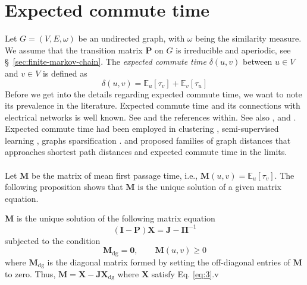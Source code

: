 \section{Expected commute time}
\label{sec:expect-comm-time}
Let $G = (V,E,\omega)$ be an undirected graph, with $\omega$ being the
similarity measure. We assume that the transition matrix
$\mathbf{P}$ on $G$ is irreducible and aperiodic, see
\S ~\ref{sec:finite-markov-chain}. The {\em expected commute time}
$\delta(u,v)$ between $u \in V$ and $v \in V$ is defined as
\begin{equation}
  \label{eq:25}
  \delta(u,v) = \mathbb{E}_{u}[\tau_v] + \mathbb{E}_{v}[\tau_u]
\end{equation}
Before we get into the details regarding expected commute time, we
want to note its prevalence in the literature. Expected commute time
and its connections with electrical networks is well known. See
\citet{doyle84:_random_walks_elect_networ,klein93:_resis_distan} and
the references within. See also \citep[\S 9 and
\S10][]{levin09:_markov}, \citep[\S 4][]{aldous99:_rever_markov} and
\citep{lyons:_probab_trees_networ}. Expected commute time
had been employed in clustering
\citep{saerens04,yen07:_graph,qui07:_clust}, semi-supervised learning
\citep{szummer01:_partial_markov,zhou04:_learn,zhou04:_learn_label_unlab,zhu03:_semi_super_learn_using_gauss},
graphs sparsification
\citep{spielmand08:_graph}. \citet{yen08:_famil_of_dissim_measur_between}
and \citet{chebotarev08:_new_famil_of_graph_distan} proposed families
of graph distances that approaches shortest path distances and
expected commute time in the limits. \\ \\
%
%
\noindent Let $\mathbf{M}$ be the matrix of mean first passage time,
i.e., $\mathbf{M}(u,v) = \mathbb{E}_{u}[\tau_v]$. The following
proposition shows that $\mathbf{M}$ is the unique solution of a given
matrix equation.
\begin{proposition}
  \label{prop:4}
 $\mathbf{M}$ is the unique solution of the following matrix equation
  \begin{equation}
    \label{eq:3}
   (\mathbf{I} - \mathbf{P})\mathbf{X} = \mathbf{J} - \bm{\Pi}^{-1}
  \end{equation}
  subjected to the condition 
  \begin{equation}
    \label{eq:32}
 \mathbf{M}_{\mathrm{dg}} = \mathbf{0}, \qquad \mathbf{M}(u,v) \geq 0   
  \end{equation}
  where $\mathbf{M}_{\mathrm{dg}}$ is the diagonal matrix formed
    by setting the off-diagonal entries of $\mathbf{M}$ to zero.
    Thus, $\mathbf{M} = \mathbf{X} -
    \mathbf{J}\mathbf{X}_{\mathrm{dg}}$ where $\mathbf{X}$ satisfy
    Eq. \eqref{eq:3}.v
\end{proposition}
